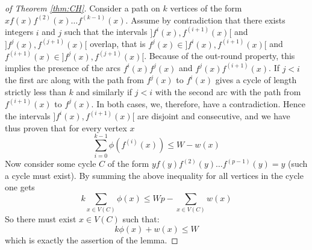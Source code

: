 \begin{proof}[of Theorem \ref{thm:CH}]
Consider a path on $k$ vertices of the form $xf(x)f^{(2)}(x)\ldots f^{(k-1)}(x)$. Assume by contradiction that there exists integers $i$ and $j$ such that the intervals $]f^{i}(x), f^{(i+1)}(x)[$ and $]f^{j}(x), f^{(j+1)}(x)[$ overlap, that is $f^{j}(x)\in ]f^{i}(x), f^{(i+1)}(x)[$ and $f^{(i+1)}(x)\in ]f^{j}(x), f^{(j+1)}(x)[$. Because of the out-round property, this implies the presence of the arcs $f^i(x)f^j(x)$ and  $f^j(x)f^{(i+1)}(x)$. If $j<i$ the first arc along with the path from $f^j(x)$ to $f^i(x)$ gives a cycle of length strictly less than $k$ and similarly if $j<i$ with the second arc with the path from $f^{(i+1)}(x)$ to $f^j(x)$. In both cases, we, therefore, have a contradiction.
Hence the intervals $]f^{i}(x), f^{(i+1)}(x)[$ are disjoint and consecutive, and we have thus proven that for every vertex $x$ 
$$\sum_{i=0}^{k-1} \phi(f^{(i)}(x)) \leq W-w(x)$$
Now consider some cycle $C$ of the form $yf(y)f^{(2)}(y)\ldots f^{(p-1)}(y)=y$ (such a cycle must exist). By summing the above inequality for all vertices in the cycle one gets
$$k\sum_{x\in V(C)} \phi(x) \leq Wp-\sum_{x\in V(C)} w(x)$$
So there must exist $x\in V(C)$ such that:
$$ k\phi(x)+w(x)\leq W $$
which is exactly the assertion of the lemma.

\end{proof}






%
%
%

